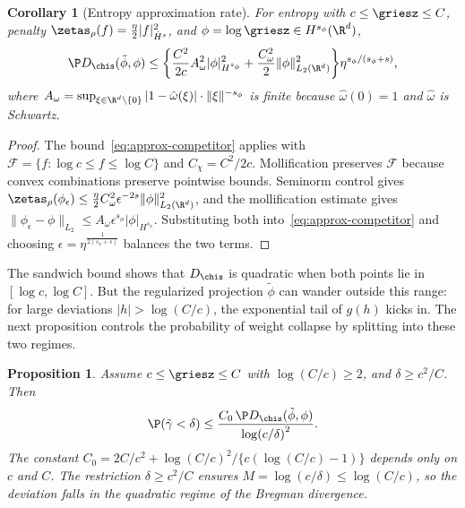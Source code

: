 \documentclass{article}
\newcommand{\F}{\mathcal{F}}
\newtheorem{corollary}[theorem]{Corollary}
\newtheorem{proposition}[theorem]{Proposition}
\begin{document}
\begin{corollary}[Entropy approximation rate]\label{cor:entropy-approx}
For entropy with $c \le \griesz \le C$, penalty $\zetas_\rho(f) = \frac{\eta}{2} |f|_{\dot H^s}^2$, and $\phi = \log \griesz \in H^{s_\phi}(\R^d)$,
\begin{equation}\label{eq:approx-rate}
\P D_{\chis}(\tilde\phi, \phi) \le \qty{\frac{C^2}{2c} A_\omega^2 |\phi|_{H^{s_\phi}}^2 + \frac{C_\omega^2}{2} \|\phi\|_{L_2(\R^d)}^2} \eta^{s_\phi/(s_\phi+s)},
\end{equation}
where $A_\omega = \sup_{\xi \in \R^d \setminus \{0\}} |1 - \hat\omega(\xi)| \cdot \|\xi\|^{-s_\phi}$ is finite because $\hat\omega(0) = 1$ and $\hat\omega$ is Schwartz.
\end{corollary}

\begin{proof}
The bound~\eqref{eq:approx-competitor} applies with $\F = \{f : \log c \le f \le \log C\}$ and $C_\chi = C^2/2c$. Mollification preserves $\F$ because convex combinations preserve pointwise bounds. Seminorm control gives $\zetas_\rho(\phi_\epsilon) \le \frac{\eta}{2} C_\omega^2 \epsilon^{-2s} \|\phi\|_{L_2(\R^d)}^2$, and the mollification estimate gives $\|\phi_\epsilon - \phi\|_{L_2} \le A_\omega \epsilon^{s_\phi} |\phi|_{H^{s_\phi}}$. Substituting both into~\eqref{eq:approx-competitor} and choosing $\epsilon = \eta^{\frac{1}{2(s_\phi + s)}}$ balances the two terms.
\end{proof}

The sandwich bound shows that $D_{\chis}$ is quadratic when both points lie in $[\log c, \log C]$. But the regularized projection $\tilde\phi$ can wander outside this range: for large deviations $|h| > \log(C/c)$, the exponential tail of $g(h)$ kicks in. The next proposition controls the probability of weight collapse by splitting into these two regimes.

\begin{proposition}\label{prop:curvature-control}
Assume $c \le \griesz \le C$ with $\log(C/c) \ge 2$, and $\delta \ge c^2/C$. Then
\[
\P(\tilde\gamma < \delta) \le \frac{C_0 \, \P D_{\chis}(\tilde\phi, \phi)}{\log(c/\delta)^2}.
\]
The constant $C_0 = 2C/c^2 + \log(C/c)^2/\{c(\log(C/c) - 1)\}$ depends only on $c$ and $C$. The restriction $\delta \ge c^2/C$ ensures $M = \log(c/\delta) \le \log(C/c)$, so the deviation falls in the quadratic regime of the Bregman divergence.
\end{proposition}
\end{document}
